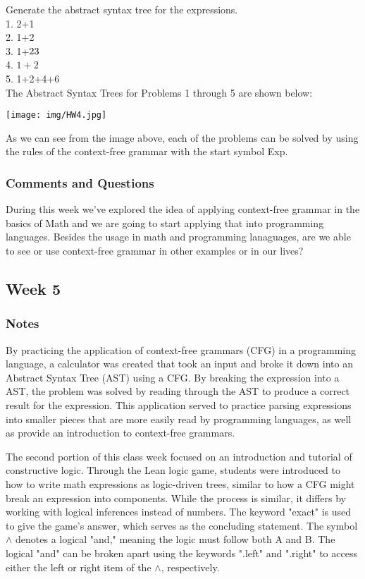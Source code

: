 \documentclass{article}
\theoremstyle{theorem}
\theoremstyle{definition}
\theoremstyle{remark}
\begin{document}
Generate the abstract syntax tree for the expressions. \\
1. 2+1 \\
2. 1+2 \\
3. 1+\(2\*3\) \\
4. \(1+2\) \\
5. 1+2+4+6 \\

\noindent
The Abstract Syntax Trees for Problems 1 through 5 are shown below:

\texttt{[image: img/HW4.jpg]}

As we can see from the image above, each of the problems can be solved by using the rules of the context-free grammar with the start symbol Exp.

\subsubsection{Comments and Questions}

During this week we've explored the idea of applying context-free grammar in the basics of Math and we are going to start applying that into programming languages. Besides the usage in math and programming lanaguages, are we able to see or use context-free grammar in other examples or in our lives?

\subsection{Week 5}

\subsubsection{Notes}

By practicing the application of context-free grammars (CFG) in a programming language, a calculator was created that took an input and broke it down into an Abstract Syntax Tree (AST) using a CFG. By breaking the expression into a AST, the problem was solved by reading through the AST to produce a correct result for the expression. This application served to practice parsing expressions into smaller pieces that are more easily read by programming languages, as well as provide an introduction to context-free grammars.

The second portion of this class week focused on an introduction and tutorial of constructive logic. Through the Lean logic game, students were introduced to how to write math expressions as logic-driven trees, similar to how a CFG might break an expression into components. While the process is similar, it differs by working with logical inferences instead of numbers. The keyword "exact" is used to give the game's answer, which serves as the concluding statement. The symbol $\wedge$ denotes a logical "and," meaning the logic must follow both A and B. The logical "and" can be broken apart using the keywords ".left" and ".right" to access either the left or right item of the $\wedge$, respectively.
\end{document}
